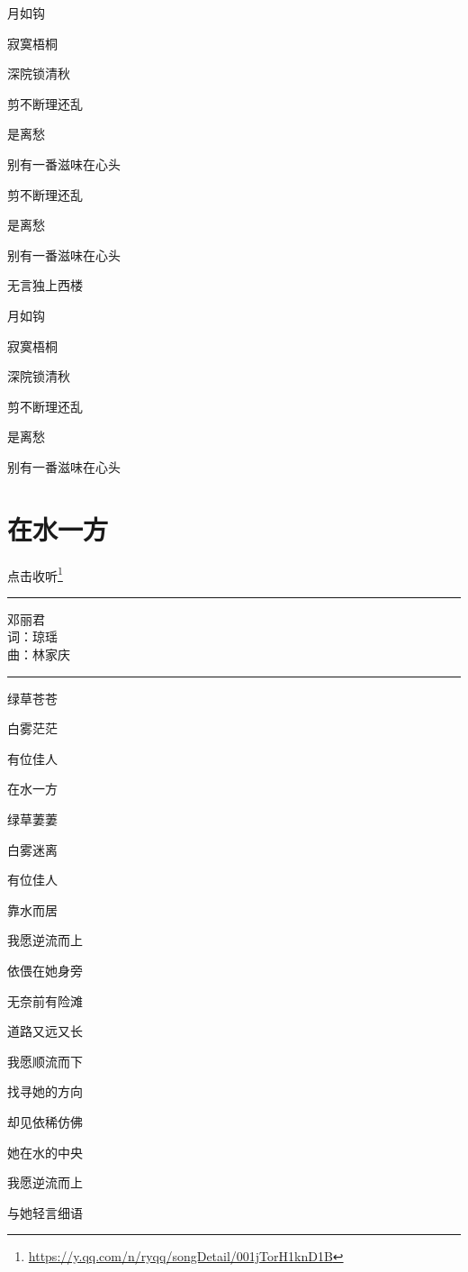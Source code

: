 \documentclass[]{ctexbook}
\renewcommand{\href}[2]{#2\footnote{\url{#1}}}
\begin{document}
月如钩

寂寞梧桐

深院锁清秋

剪不断理还乱

是离愁

别有一番滋味在心头

剪不断理还乱

是离愁

别有一番滋味在心头

无言独上西楼

月如钩

寂寞梧桐

深院锁清秋

剪不断理还乱

是离愁

别有一番滋味在心头

\section*{在水一方}\label{on-the-water-side}


\href{https://y.qq.com/n/ryqq/songDetail/001jTorH1knD1B}{点击收听}

\begin{center}\rule{0.5\linewidth}{0.5pt}\end{center}

邓丽君\\
词：琼瑶\\
曲：林家庆

\begin{center}\rule{0.5\linewidth}{0.5pt}\end{center}

绿草苍苍

白雾茫茫

有位佳人

在水一方

绿草萋萋

白雾迷离

有位佳人

靠水而居

我愿逆流而上

依偎在她身旁

无奈前有险滩

道路又远又长

我愿顺流而下

找寻她的方向

却见依稀仿佛

她在水的中央

我愿逆流而上

与她轻言细语
\end{document}
